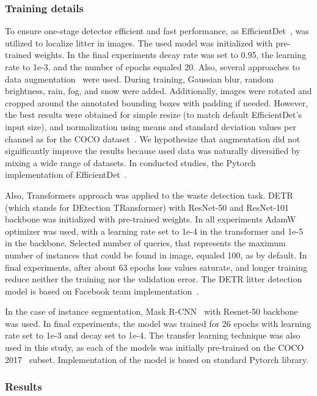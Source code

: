 \documentclass{article}
\begin{document}
\subsubsection{Training details}
To ensure one-stage detector efficient and fast performance, as EfficientDet~\cite{efficientdet2020}, was utilized to localize litter in images. The used model was initialized with pre-trained weights. In the final experiments decay rate was set to 0.95, the learning rate to 1e-3, and the number of epochs equaled 20. Also, several approaches to data augmentation~\cite{albumentations} were used. During training, Gaussian blur, random brightness, rain, fog, and snow were added. Additionally, images were rotated and cropped around the annotated bounding boxes with padding if needed. However, the best results were obtained for simple resize (to match default EfficientDet's input size), and normalization using means and standard deviation values per channel as for the COCO dataset~\cite{bib:COCO2014}. We hypothesize that augmentation did not significantly improve the results because used data was naturally diversified by mixing a wide range of datasets. In conducted studies, the Pytorch implementation of EfficientDet~\cite{effdet-pytorch}.

Also, Transformers approach was applied to the waste detection task. DETR (which stands for DEtection TRansformer) with ResNet-50 and ResNet-101 backbone was initialized with pre-trained weights. In all experiments AdamW~\cite{diederik2017adam} optimizer was used, with a learning rate set to 1e-4 in the transformer and 1e-5 in the backbone. Selected number of queries, that represents the maximum number of instances that could be found in image, equaled 100, as by default. In final experiments, after about 63 epochs loss values saturate, and longer training reduce neither the training nor the validation error. The DETR litter detection model is based on Facebook team implementation~\cite{detr}. 

In the case of instance segmentation, Mask R-CNN~\cite{he2017mask} with Resnet-50 backbone was used. In final experiments, the model was trained for 26 epochs with learning rate set to 1e-3 and decay set to 1e-4. The transfer learning technique was also used in this study, as each of the models was initially pre-trained on the COCO 2017~\cite{COCO2017} subset. Implementation of the model is based on standard Pytorch library. 

\subsubsection{Results}
\end{document}
